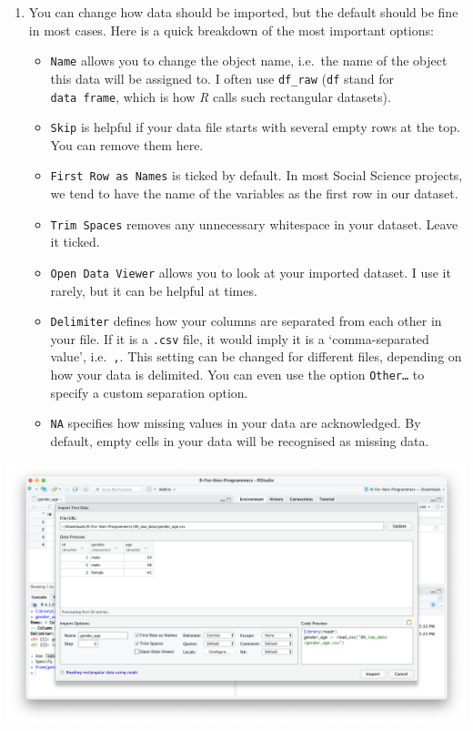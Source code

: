 \documentclass[
  letterpaper,
  DIV=11,
  numbers=noendperiod]{scrreprt}
\begin{document}
\begin{enumerate}
\def\labelenumi{\arabic{enumi}.}
\setcounter{enumi}{3}
\item
  You can change how data should be imported, but the default should be
  fine in most cases. Here is a quick breakdown of the most important
  options:

  \begin{itemize}
  \item
    \texttt{Name} allows you to change the object name, i.e.~the name of
    the object this data will be assigned to. I often use
    \texttt{df\_raw} (\texttt{df} stand for \texttt{data\ frame}, which
    is how \emph{R} calls such rectangular datasets).
  \item
    \texttt{Skip} is helpful if your data file starts with several empty
    rows at the top. You can remove them here.
  \item
    \texttt{First\ Row\ as\ Names} is ticked by default. In most Social
    Science projects, we tend to have the name of the variables as the
    first row in our dataset.
  \item
    \texttt{Trim\ Spaces} removes any unnecessary whitespace in your
    dataset. Leave it ticked.
  \item
    \texttt{Open\ Data\ Viewer} allows you to look at your imported
    dataset. I use it rarely, but it can be helpful at times.
  \item
    \texttt{Delimiter} defines how your columns are separated from each
    other in your file. If it is a \texttt{.csv} file, it would imply it
    is a `comma-separated value', i.e.~\texttt{,}. This setting can be
    changed for different files, depending on how your data is
    delimited. You can even use the option \texttt{Other…} to specify a
    custom separation option.
  \item
    \texttt{NA} specifies how missing values in your data are
    acknowledged. By default, empty cells in your data will be
    recognised as missing data.
  \end{itemize}
\end{enumerate}

\includegraphics{images/chapter_07_img/01_files_pane_import/03_files_pane_import.png}
\end{document}
